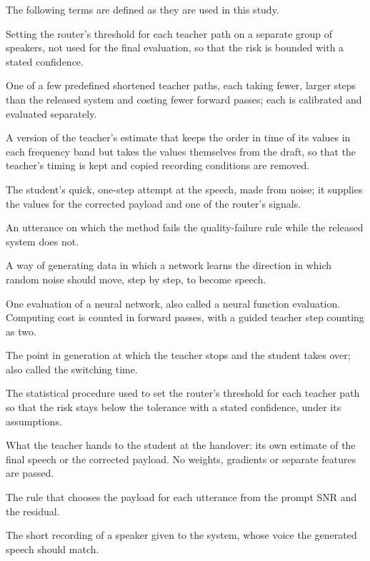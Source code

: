 The following terms are defined as they are used in this study.
\begin{description}[leftmargin=0pt,itemsep=2pt,font=\normalfont\itshape]
\item[Calibration.] Setting the router's threshold for each teacher path on a separate group of speakers, not used for the final evaluation, so that the risk is bounded with a stated confidence.
\item[Candidate teacher path.] One of a few predefined shortened teacher paths, each taking fewer, larger steps than the released system and costing fewer forward passes; each is calibrated and evaluated separately.
\item[Corrected payload.] A version of the teacher's estimate that keeps the order in time of its values in each frequency band but takes the values themselves from the draft, so that the teacher's timing is kept and copied recording conditions are removed.
\item[Draft.] The student's quick, one-step attempt at the speech, made from noise; it supplies the values for the corrected payload and one of the router's signals.
\item[Excess failure.] An utterance on which the method fails the quality-failure rule while the released system does not.
\item[Flow matching.] A way of generating data in which a network learns the direction in which random noise should move, step by step, to become speech.
\item[Forward pass.] One evaluation of a neural network, also called a neural function evaluation. Computing cost is counted in forward passes, with a guided teacher step counting as two.
\item[Handover.] The point in generation at which the teacher stops and the student takes over; also called the switching time.
\item[Learn-Then-Test.] The statistical procedure used to set the router's threshold for each teacher path so that the risk stays below the tolerance with a stated confidence, under its assumptions.
\item[Payload.] What the teacher hands to the student at the handover: its own estimate of the final speech or the corrected payload. No weights, gradients or separate features are passed.
\item[Payload router.] The rule that chooses the payload for each utterance from the prompt SNR and the residual.
\item[Prompt.] The short recording of a speaker given to the system, whose voice the generated speech should match.

\end{description}
